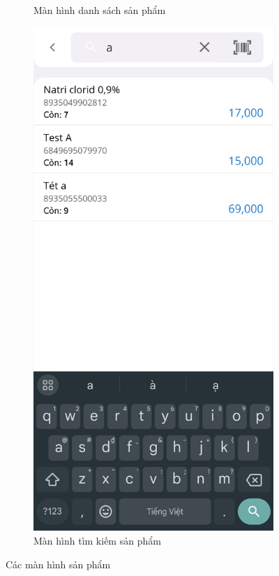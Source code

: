 \documentclass[../DoAn.tex]{subfiles}
\begin{document}
\begin{figure}[H]
\begin{subfigure}{0.49\linewidth}
        \caption{Màn hình danh sách sản phẩm}
        \label{figure:screen-productlistpage}
    \end{subfigure}
    \begin{subfigure}{0.5\linewidth}
        \centering
        \includegraphics[width=0.9\linewidth]{Hinhve/design/screens/ProductSearchPage}
        \caption{Màn hình tìm kiếm sản phẩm}
        \label{figure:screen-productsearchpage}
    \end{subfigure}
    \caption{Các màn hình sản phẩm}
    \label{figure:screen-productpages1}
\end{figure}
\break
\end{document}
